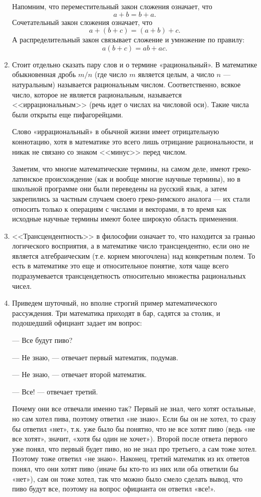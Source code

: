 \begin{enumerate}
Напомним, что переместительный закон сложения означает, что
$$
a+b = b+a.
$$
Сочетательный закон сложения означает, что
$$
a+(b+c) = (a+b)+c.
$$
А распределительный закон связывает сложение и умножение по правилу:
$$
a(b+c) = ab + ac.
$$

\item Стоит отдельно сказать пару слов и о термине «рациональный». В математике обыкновенная дробь $m/n$ (где число $m$ является целым, а число $n$ --- натуральным) называется рациональным числом. Соответственно, всякое число, которое не является рациональным, называется <<иррациональным>> (речь идет о числах на числовой оси). Такие числа были открыты еще пифагорейцами.

Слово «иррациональный» в обычной жизни имеет отрицательную коннотацию, хотя в математике это всего лишь отрицание рациональности, и никак не связано со знаком <<минус>> перед числом.

Заметим, что многие математические термины, на самом деле, имеют греко-латинское происхождение (как и вообще многие научные термины), но в школьной программе они были переведены на русский язык, а затем закрепились за частным случаем своего греко-римского аналога --- их стали относить только к операциям с числами и векторами, в то время как исходные научные термины имеют более широкую область применения.

\item <<Трансцендентность>> в философии означает то, что находится за гранью логического восприятия, а в математике число трансцендентно, если оно не является алгебраическим (т.е. корнем многочлена) над конкретным полем. То есть в математике это еще и относительное понятие, хотя чаще всего подразумевается трансцендетность относительно множества рациональных чисел.
\item Приведем шуточный, но вполне строгий пример математического рассуждения. Три математика приходят в бар, садятся за столик, и подошедший официант задает им вопрос:

--- Все будут пиво?

--- Не знаю, --- отвечает первый математик, подумав.

--- Не знаю, --- отвечает второй математик.

--- Все! --- отвечает третий.


Почему они все отвечали именно так? Первый не знал, чего хотят остальные, но сам хотел пива, поэтому ответил «не знаю». Если бы он не хотел, то сразу бы ответил «нет», т.к. уже было бы понятно, что не все хотят пиво (ведь «не все хотят», значит, «хотя бы один не хочет»). Второй после ответа первого уже понял, что первый будет пиво, но не знал про третьего, а сам тоже хотел. Поэтому тоже ответил «не знаю». Наконец, третий математик из их ответов понял, что они хотят пиво (иначе бы кто-то из них или оба ответили бы «нет»), сам он тоже хотел, так что можно было смело сделать вывод, что пиво будут все, поэтому на вопрос официанта он ответил «все!».


\end{enumerate}
